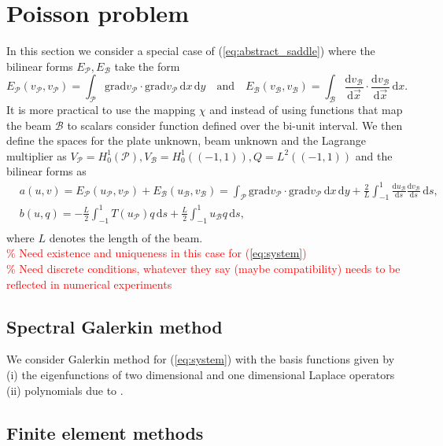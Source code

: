 \documentclass[a4paper,10pt]{article}
\newcommand{\deriv}[2]{\ensuremath{\frac{\mathrm{d}#1}{\mathrm{d}#2}}}
\newcommand{\meas}[1]{\ensuremath{\,\mathrm{d}#1}}
\newcommand{\Grad}[1]{\ensuremath{\text{grad}#1}}
\newcommand{\Vp}{\ensuremath{V_{\mathcal{P}}}}
\newcommand{\Vb}{\ensuremath{V_{\mathcal{B}}}}
\newcommand{\Ep}{\ensuremath{E_{\mathcal{P}}}}
\newcommand{\Eb}{\ensuremath{E_{\mathcal{B}}}}
\newcommand{\up}{\ensuremath{u_{\mathcal{P}}}}
\newcommand{\ub}{\ensuremath{u_{\mathcal{B}}}}
\newcommand{\vp}{\ensuremath{v_{\mathcal{P}}}}
\newcommand{\vb}{\ensuremath{v_{\mathcal{B}}}}
\newcommand{\TODO}[1]{\textcolor{red}{#1}}
\begin{document}
  \section{Poisson problem}
  In this section we consider a special case of (\ref{eq:abstract_saddle}) where
  the bilinear forms $\Ep, \Eb$ take the form
  \[\Ep(\vp,\vp)=\int_\mathcal{P}\Grad{\vp}\cdot\Grad{\vp}\meas{x}\meas{y}
    \quad\text{and}\quad
  \Eb(\vb,\vb)=\int_\mathcal{B}\deriv{\vb}{\vec{x}}\cdot\deriv{\vb}{\vec{x}}\meas{x}.
  \]
  It is more practical to use the mapping $\chi$ and instead of using functions
  that map the beam $\mathcal{B}$ to scalars consider function defined over the
bi-unit interval. We then define the spaces for the plate unknown,
beam unknown and the Lagrange multiplier as 
$\Vp=H^1_0\left(\mathcal{P}\right), \Vb=H^1_0\left(\left(-1, 1\right)\right),
Q=L^2\left(\left(-1, 1\right)\right)$ and the bilinear forms as
\[
  \begin{aligned}
  &a(u, v) = \Ep(\up, \vp) + \Eb(\ub, \vb) = \int_\mathcal{P}\Grad{\vp}\cdot\Grad{\vp}\meas{x}\meas{y}
  + \frac{2}{L}\int_{-1}^{1}\deriv{\ub}{s}\deriv{\vb}{s}\meas{s},\\
  &b(u, q) = -\frac{L}{2}\int_{-1}^{1}T(\up)q\meas{s} +
  \frac{L}{2}\int_{-1}^{1}\ub q\meas{s},\\
  \end{aligned}
\]
where $L$ denotes the length of the beam. \\
\TODO{
\% Need existence and uniqueness in this case for (\ref{eq:system})\\
\% Need discrete conditions, whatever they say (maybe compatibility) needs to
be reflected in numerical experiments\\
}
\subsection{Spectral Galerkin method}
We consider Galerkin method for (\ref{eq:system}) with the basis functions
given by (i) the eigenfunctions of two dimensional and one dimensional Laplace
operators (ii) polynomials due to \cite{shen_leg}.
\subsection{Finite element methods}



  
  
\end{document}
